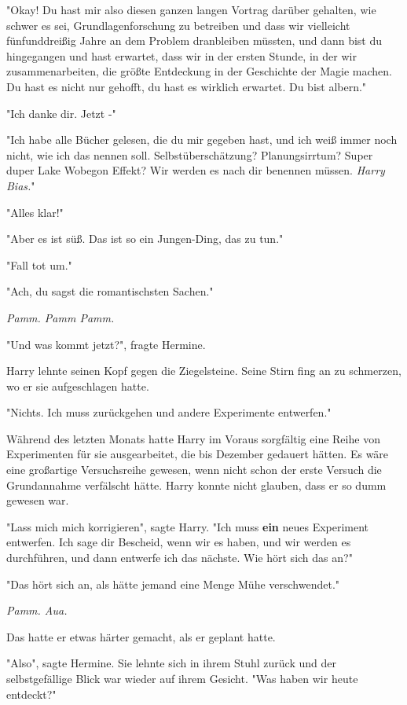 {"Okay! Du hast mir also diesen ganzen langen Vortrag darüber gehalten, wie schwer es sei, Grundlagenforschung zu betreiben und dass wir vielleicht fünfunddreißig Jahre an dem Problem dranbleiben müssten, und dann bist du hingegangen und hast erwartet, dass wir in der ersten Stunde, in der wir zusammenarbeiten, die größte Entdeckung in der Geschichte der Magie machen. Du hast es nicht nur gehofft, du hast es wirklich erwartet. Du bist albern."

"Ich danke dir. Jetzt -"

"Ich habe alle Bücher gelesen, die du mir gegeben hast, und ich weiß immer noch nicht, wie ich das nennen soll. Selbstüberschätzung? Planungsirrtum? Super duper Lake Wobegon Effekt? Wir werden es nach dir benennen müssen. \emph{Harry Bias.}"

"Alles klar!"

"Aber es ist süß. Das ist so ein Jungen-Ding, das zu tun."

"Fall tot um."

"Ach, du sagst die romantischsten Sachen."

\emph{Pamm. Pamm Pamm.}

"Und was kommt jetzt?", fragte Hermine.

Harry lehnte seinen Kopf gegen die Ziegelsteine. Seine Stirn fing an zu schmerzen, wo er sie aufgeschlagen hatte.

"Nichts. Ich muss zurückgehen und andere Experimente entwerfen."

Während des letzten Monats hatte Harry im Voraus sorgfältig eine Reihe von Experimenten für sie ausgearbeitet, die bis Dezember gedauert hätten. Es wäre eine großartige Versuchsreihe gewesen, wenn nicht schon der erste Versuch die Grundannahme verfälscht hätte. Harry konnte nicht glauben, dass er so dumm gewesen war.

"Lass mich mich korrigieren", sagte Harry. "Ich muss \textbf{ein} neues Experiment entwerfen. Ich sage dir Bescheid, wenn wir es haben, und wir werden es durchführen, und dann entwerfe ich das nächste. Wie hört sich das an?"

"Das hört sich an, als hätte jemand eine Menge Mühe verschwendet."

\emph{Pamm. Aua.}

Das hatte er etwas härter gemacht, als er geplant hatte.

"Also", sagte Hermine. Sie lehnte sich in ihrem Stuhl zurück und der selbstgefällige Blick war wieder auf ihrem Gesicht. "Was haben wir heute entdeckt?"

}

